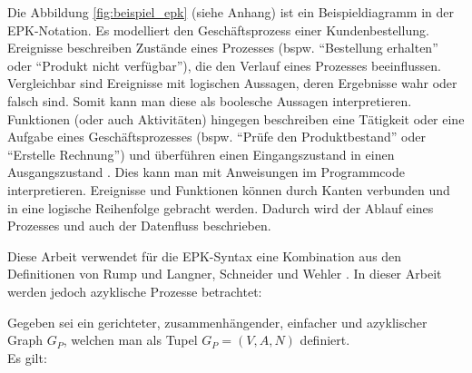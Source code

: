 \noindent Die Abbildung \ref{fig:beispiel_epk} (siehe Anhang) ist ein Beispieldiagramm in der EPK-Notation. Es modelliert den Geschäftsprozess einer Kundenbestellung. Ereignisse beschreiben Zustände eines Prozesses (bspw. ``Bestellung erhalten'' oder ``Produkt nicht verfügbar''), die den Verlauf eines Prozesses beeinflussen. \cite{gadatsch_grundkurs_2008}
Vergleichbar sind Ereignisse mit logischen Aussagen, deren Ergebnisse wahr oder falsch sind. Somit kann man diese als boolesche Aussagen interpretieren. Funktionen (oder auch Aktivitäten) hingegen beschreiben 
eine Tätigkeit oder eine Aufgabe eines Geschäftsprozesses (bspw. ``Prüfe den Produktbestand'' oder ``Erstelle Rechnung'') und überführen einen Eingangszustand in einen Ausgangszustand \cite{gadatsch_grundkurs_2008}. Dies kann man mit Anweisungen im Programmcode 
interpretieren. Ereignisse und Funktionen können durch Kanten verbunden und in eine logische Reihenfolge gebracht werden. Dadurch wird der
Ablauf eines Prozesses und auch der Datenfluss beschrieben. \cite{gadatsch_grundkurs_2008} 

\noindent Diese Arbeit verwendet für die EPK-Syntax eine Kombination aus den Definitionen von Rump \cite{rump_geschaftsprozesmanagement_1999} und Langner, Schneider und Wehler \cite{langner_ereignisgesteuerte_1997}. In dieser Arbeit werden jedoch azyklische Prozesse betrachtet:

\noindent Gegeben sei ein gerichteter, zusammenhängender, einfacher und azyklischer Graph $G_P$, welchen man als Tupel $G_P = (V, A, N)$ definiert. \\
Es gilt:

